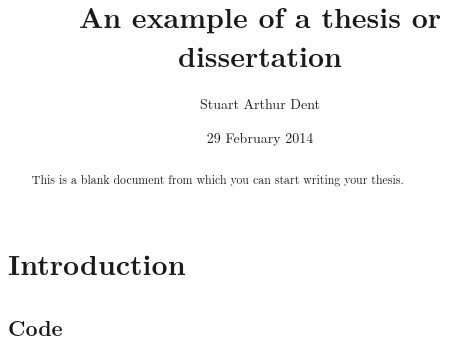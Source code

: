 \documentclass{sfuthesis}
\title{An example of a thesis or dissertation}
\author{Stuart Arthur Dent}
\date{29 February 2014}
\begin{document}
\frontmatter
\maketitle
\makecommittee%
\makecopyrightdeclaration%

\begin{abstract}
	This is a blank document from which you can start writing your thesis.
\end{abstract}


\begin{dedication} %
\end{dedication}


\begin{acknowledgements} %
\end{acknowledgements}

\tableofcontents\clearpage
{}\listoftables\clearpage
{}\listoffigures





%
%

\mainmatter%

\chapter{Introduction}





%
%

\backmatter%
	
	

\begin{appendices} %
	\chapter{Code}
\end{appendices}
\end{document}
